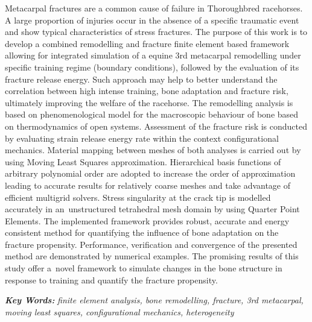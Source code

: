 \documentclass[11pt]{ACMEarticle}
\numberwithin{equation}{section}
\begin{document}
{\small 
	Metacarpal fractures are a common cause of failure in Thoroughbred racehorses. A large proportion of injuries occur in the absence of a specific traumatic event and show typical characteristics of stress fractures. The purpose of this work is to develop a combined remodelling and fracture finite element based framework allowing for integrated simulation of a equine 3rd metacarpal remodelling under specific training regime (boundary conditions), followed by the evaluation of its fracture release energy. Such approach may help to better understand the correlation between high intense training, bone adaptation and fracture risk, ultimately improving the welfare of the racehorse. The remodelling analysis is based on phenomenological model for the macroscopic behaviour of bone based on thermodynamics of open systems. Assessment of the fracture risk is conducted by evaluating strain release energy rate within the context configurational mechanics. Material mapping between meshes of both analyses is carried out by using Moving Least Squares approximation. Hierarchical basis functions of arbitrary polynomial order are adopted to increase the order of approximation leading to accurate results for relatively coarse meshes and take advantage of efficient multigrid solvers. Stress singularity at the crack tip is modelled accurately in an~unstructured tetrahedral mesh domain by using Quarter Point Elements. The implemented framework provides robust, accurate and energy consistent method for quantifying the influence of bone adaptation on the fracture propensity. Performance, verification and convergence of the presented method are demonstrated by numerical examples. The promising results of this study offer a~novel framework to simulate changes in the bone structure in response to training and quantify the fracture propensity. 
	
\textbf{\textit{Key Words:}} {\it finite element analysis, bone remodelling, fracture, 3rd metacarpal, moving least squares, configurational mechanics, heterogeneity}}
%
\\
\newpage
\end{document}
